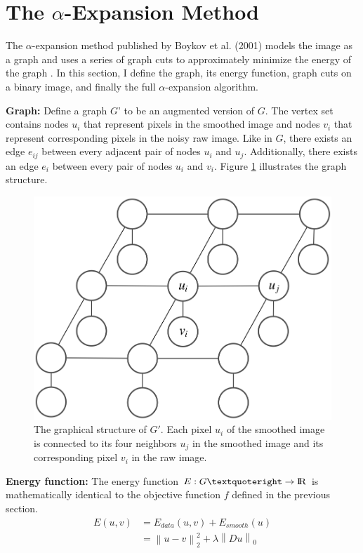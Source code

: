 \documentclass[10pt,twocolumn,letterpaper]{article}
\begin{document}
\section{The $\alpha$-Expansion Method}
The $\alpha$-expansion method published by Boykov et al. (2001) models the image as a graph and uses a series of graph cuts to approximately minimize the energy of the graph \cite{boykov2001fast}. In this section, I define the graph, its energy function, graph cuts on a binary image, and finally the full $\alpha$-expansion algorithm.

{\bf Graph: } Define a graph $G’$ to be an augmented version of $G$. The vertex set contains nodes $u_i$ that represent pixels in the smoothed image and nodes $v_i$ that represent corresponding pixels in the noisy raw image. Like in $G$, there exists an edge $e_{ij}$ between every adjacent pair of nodes $u_i$ and $u_j$. Additionally, there exists an edge $e_i$ between every pair of nodes $u_i$ and $v_i$. Figure \ref{fig:graph} illustrates the graph structure.

\begin{figure}[t]
\includegraphics[width = \linewidth]{graph.png}
\caption{The graphical structure of $G'$. Each pixel $u_i$ of the smoothed image is connected to its four neighbors $u_j$ in the smoothed image and its corresponding pixel $v_i$ in the raw image.}
\label{fig:graph}
\end{figure}

{\bf Energy function: }	The energy function $E:G’ \rightarrow {\rm I\!R} $ is mathematically identical to the objective function $f$ defined in the previous section.
\begin{align*}
	E(u, v) &= E_{data}(u, v) + E_{smooth}(u) \\
    &= \left \| u - v \right \|_2^2 + \lambda \left \| Du \right \|_0
\end{align*}
\end{document}
